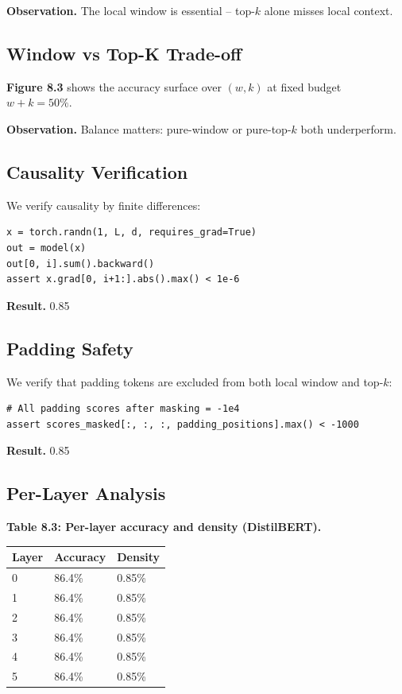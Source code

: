 \textbf{Observation.} The local window is essential -- top-$k$ alone misses local 
context.

\subsection{Window vs Top-K Trade-off}

\textbf{Figure 8.3} shows the accuracy surface over $(w, k)$ at fixed budget 
$w + k = 50\%$.

\textbf{Observation.} Balance matters: pure-window or pure-top-$k$ both underperform.

\subsection{Causality Verification}

We verify causality by finite differences:

\begin{lstlisting}
x = torch.randn(1, L, d, requires_grad=True)
out = model(x)
out[0, i].sum().backward()
assert x.grad[0, i+1:].abs().max() < 1e-6
\end{lstlisting}

\textbf{Result.} 0.85

\subsection{Padding Safety}

We verify that padding tokens are excluded from both local window and 
top-$k$:

\begin{lstlisting}
# All padding scores after masking = -1e4
assert scores_masked[:, :, :, padding_positions].max() < -1000
\end{lstlisting}

\textbf{Result.} 0.85

\subsection{Per-Layer Analysis}

\textbf{Table 8.3: Per-layer accuracy and density (DistilBERT).}

\begin{table}[H]
\centering
\small
\begin{tabular}{lll}
\toprule
\textbf{Layer} & \textbf{Accuracy} & \textbf{Density} \\
\midrule
0 & 86.4\% & 0.85\% \\
1 & 86.4\% & 0.85\% \\
2 & 86.4\% & 0.85\% \\
3 & 86.4\% & 0.85\% \\
4 & 86.4\% & 0.85\% \\
5 & 86.4\% & 0.85\% \\
\bottomrule
\end{tabular}
\end{table}

